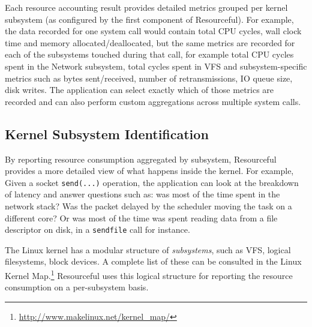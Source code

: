 \documentclass[letterpaper,twocolumn,10pt]{article}
\newcommand{\pname}{Resourceful}
\newcommand{\lnote}[1]{\textcolor{red}{[\textit{#1}]}} %
\begin{document}
Each resource accounting result provides detailed metrics grouped per kernel
subsystem (as configured by the first component of \pname). For example, the data recorded
for one system call would contain total CPU cycles, wall clock time and memory
allocated/deallocated, but the same metrics are recorded for each of the
subsystems touched during that call, for example total CPU cycles spent in the Network
subsystem, total cycles spent in VFS and subsystem-specific metrics such as
bytes sent/received, number of retransmissions, IO queue size, disk writes. The application can select exactly which of those metrics are recorded
and can also perform custom aggregations across multiple system calls.

\subsection{Kernel Subsystem Identification}
By reporting resource consumption aggregated by subsystem, Resourceful provides
a more detailed view of what happens inside the kernel. For example,  Given a
socket \texttt{send(...)} operation, the application can look at the breakdown
of latency and answer questions such as: was most of the time spent in the
network stack? Was the packet delayed by the scheduler moving the task on a
different core? Or was most of the time was spent reading data from a file
descriptor on disk, in a \texttt{sendfile} call for instance.
 
The Linux kernel has a modular structure of \emph{subsystems}, such as VFS,
logical filesystems, block devices. A complete list of these can be consulted in
the Linux Kernel Map.\footnote{\url{http://www.makelinux.net/kernel_map/}}
\pname{ }uses this logical structure for reporting the resource consumption on a
per-subsystem basis. 


\end{document}
